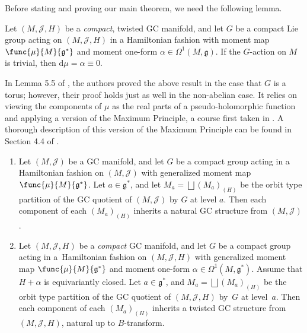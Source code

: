 Before stating and proving our main theorem, we need the following lemma.


\begin{Lemma} \label{lem1}
Let $(M,\mathcal{J},H)$ be a \emph{compact}, twisted GC manifold, and let $G$ be a compact Lie group acting on $(M,\mathcal{J},H)$ in a Hamiltonian fashion with moment map $\func{\mu}{M}{\mathfrak{g}^*}$ and moment one-form $\alpha \in \Omega^1(M,\mathfrak{g})$.
If the $G$-action on $M$ is trivial, then $\mathrm{d} \mu = \alpha \equiv 0$.
\end{Lemma}


In Lemma 5.5 of \cite{linbaird}, the authors proved the above result in the case that $G$ is a torus;  however, their proof holds just as well in the non-abelian case.  It relies on viewing the components of $\mu$ as the real parts of a pseudo-holomorphic function and applying a version of the Maximum Principle, a course f\/irst taken in \cite{nitta}.  A thorough description of this version of the Maximum Principle can be found in Section 4.4 of \cite{MyThesis}.

\begin{Theorem} \label{MainThm} \qquad
\begin{enumerate} \itemsep=0pt\litlet
  \item Let $(M,\mathcal{J})$ be a GC manifold, and let $G$ be a compact group acting in a Hamiltonian fashion on $(M,\mathcal{J})$ with generalized moment map $\func{\mu}{M}{\mathfrak{g}^*}$.  Let $a \in \mathfrak{g}^*$, and let $M_a = \bigsqcup (M_{a})_{(H)}$ be the orbit type partition of the GC quotient of $(M,\mathcal{J})$ by $G$ at level $a$.
  Then each component of each $\left( M_{a} \right)_{(H)}$ inherits a natural GC structure from $(M,\mathcal{J})$.

  \item Let $(M,\mathcal{J},H)$ be a \emph{compact} GC manifold, and let $G$ be a compact group acting in a~Hamiltonian fashion on $(M,\mathcal{J},H)$ with generalized moment map $\func{\mu}{M}{\mathfrak{g}^*}$ and moment one-form $\alpha \in \Omega^1(M,\mathfrak{g}^*)$.  Assume that $H+\alpha$ is equivariantly closed.
Let $a \in \mathfrak{g}^*$, and $M_a = \bigsqcup (M_{a})_{(H)}$ be the orbit type partition of the GC quotient of $(M,\mathcal{J},H)$ by~$G$ at level~$a$.
  Then each component of each $\left( M_{a} \right)_{(H)}$ inherits a twisted GC structure from $(M,\mathcal{J},H)$, natural up to $B$-transform.
\end{enumerate}
\end{Theorem}


